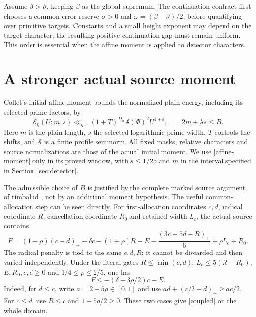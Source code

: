\documentclass[10pt,a4paper]{article}
\newcommand{\tht}{\vartheta}
\newcommand{\EE}{\mathcal E}
\begin{document}
Assume $\beta>\tht$, keeping $\beta$ as the global supremum. The continuation
contract first chooses a common error reserve $\sigma>0$ and
$\omega=(\beta-\tht)/2$, before quantifying over primitive targets.
Constants and a small height exponent may depend on the target character;
the resulting positive continuation gap must remain uniform. This order
is essential when the affine moment is applied to detector characters.

\section{A stronger actual source moment}
Collet's initial affine moment bounds the normalized plain energy, including
its selected prime factors, by
\begin{equation}
 \EE_\eta(U;m,s)\ll_{\eta,\varepsilon}
 (1+T)^{D_\eta}\,\mathcal S(\Phi)^2 U^{1+\varepsilon},
 \qquad 2m+\lambda s\leq B.\label{affine-moment}
\end{equation}
Here $m$ is the plain length, $s$ the selected logarithmic prime width,
$T$ controls the shifts, and $\mathcal S$ is a finite profile seminorm.
All fixed masks, relative characters and source normalizations are those of
the actual initial moment. We use \eqref{affine-moment} only in its proved
window, with $s\leq1/25$ and $m$ in the interval specified in Section~\ref{sec:detector}.

The admissible choice of $B$ is justified by the complete marked source
argument of timbalud \cite{asymmetric}, not by an additional moment hypothesis.
The useful common-allocation step can be seen directly. For first-allocation
coordinates $c,d$, radical coordinate $R$, cancellation coordinate $R_0$ and
retained width $L_c$, the actual source contains
\begin{equation}
 F=(1-\rho)(c-d)_+-\delta c-(1+\rho)R-E
       -\frac{(3c-5d-R)_+}{6}+\rho L_c+R_0.\label{common-word}
\end{equation}
The radical penalty is tied to the same $c,d,R$; it cannot be discarded and
then varied independently. Under the literal gates
$R\leq\min(c,d)$, $L_c\leq5(R-R_0)$, $E,R_0,c,d\geq0$ and
$1/4\leq\rho\leq2/5$, one has
\begin{equation}
 F\leq-(\delta-3\rho/2)c-E.\label{coupled}
\end{equation}
Indeed, for $d\leq c$, write $a=2-5\rho\in[0,1]$ and use
$a d+(c/2-d)_+\geq ac/2$. For $c\leq d$, use $R\leq c$ and
$1-5\rho/2\geq0$. These two cases give \eqref{coupled} on the whole domain.
\end{document}
